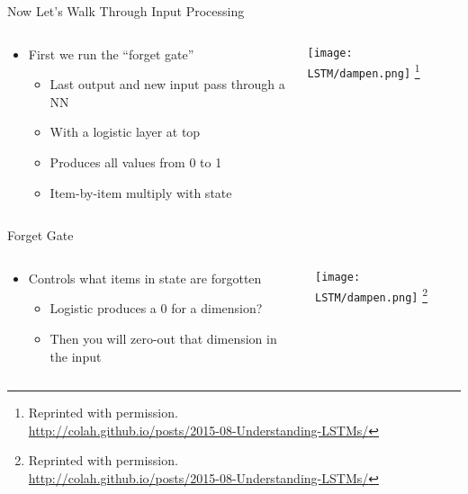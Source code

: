 \documentclass[aspectratio=169]{beamer}
\begin{document}
\begin{frame}{Now Let's Walk Through Input Processing}

\begin{columns}
\begin{column}{0.5\textwidth}
\begin{itemize}
	\item First we run the ``forget gate''
	\begin{itemize}
		\item Last output and new input pass through a NN
		\item With a logistic layer at top
		\item Produces all values from 0 to 1
		\item Item-by-item multiply with state
	\end{itemize}
\end{itemize}
\end{column}
\begin{column}{0.5\textwidth}
\texttt{[image: LSTM/dampen.png]}
\footnote{Reprinted with permission.\\ \hspace{1.7em}\url{http://colah.github.io/posts/2015-08-Understanding-LSTMs/}}
\end{column}
\end{columns}
\end{frame}
\begin{frame}{Forget Gate}

\begin{columns}
\begin{column}{0.5\textwidth}
\begin{itemize}
	\item Controls what items in state are forgotten
	\begin{itemize}
		\item Logistic produces a 0 for a dimension?
		\item Then you will zero-out that dimension in the input
	\end{itemize}
\end{itemize}
\end{column}
\begin{column}{0.5\textwidth}
\texttt{[image: LSTM/dampen.png]}
\footnote{Reprinted with permission.\\ \hspace{1.7em}\url{http://colah.github.io/posts/2015-08-Understanding-LSTMs/}}
\end{column}
\end{columns}
\end{frame}
\end{document}
